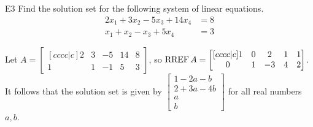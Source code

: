 \documentclass{sbgLAexam}
\begin{document}
\begin{extract}\newpage\end{extract}
\begin{problem}{E3}
Find the solution set for the following system of linear equations.
\begin{align*}
2x_1+3x_2-5x_3+14x_4 &= 8 \\
x_1+x_2-x_3+5x_4&= 3
\end{align*}
\end{problem}
\begin{solution}
Let \(A =
  \begin{bmatrix}[cccc|c]
    2 & 3 & -5 & 14 & 8 \\
    1 & 1 & -1 & 5 & 3
  \end{bmatrix}
\), so \(\operatorname{RREF} A =
  \begin{bmatrix}[cccc|c]
    1 & 0 & 2 & 1 & 1 \\
    0 & 1 & -3 & 4 & 2 \\
  \end{bmatrix}
\). It follows that the solution set is given by \(
  \begin{bmatrix}
    1 - 2a - b \\
    2 + 3a - 4b \\
    a \\
    b
  \end{bmatrix}
\) for all real numbers \(a,b\).
\end{solution}
\end{document}
